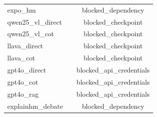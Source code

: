\begin{tabular}{lcc}
expo\_hm &  & blocked\_dependency \\
qwen25\_vl\_direct &  & blocked\_checkpoint \\
qwen25\_vl\_cot &  & blocked\_checkpoint \\
llava\_direct &  & blocked\_checkpoint \\
llava\_cot &  & blocked\_checkpoint \\
gpt4o\_direct &  & blocked\_api\_credentials \\
gpt4o\_cot &  & blocked\_api\_credentials \\
gpt4o\_rag &  & blocked\_api\_credentials \\
explainhm\_debate &  & blocked\_dependency \\
\bottomrule
\end{tabular}
